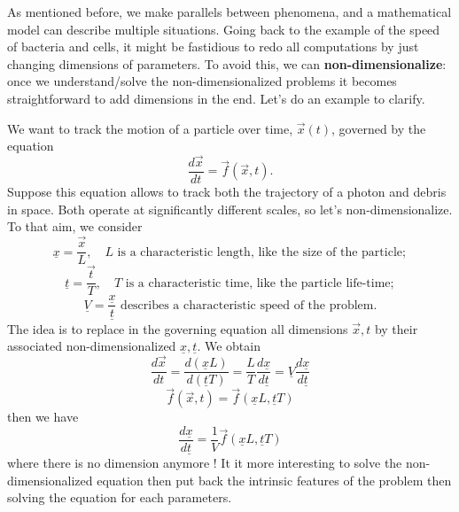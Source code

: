As mentioned before, we make parallels between phenomena, and a mathematical model can describe multiple situations. Going back to the example of the speed of bacteria and cells, it might be fastidious to redo all computations by just changing dimensions of parameters. To avoid this, we can \textbf{non-dimensionalize}: once we understand/solve the non-dimensionalized problems it becomes straightforward to add dimensions in the end. Let's do an example to clarify.

\begin{Example}
We want to track the motion of a particle over time, $\vec{x}(t)$, governed by the equation
\[ \displaystyle \frac{d \vec{x}}{dt} = \vec{f}(\vec{x},t).\]
Suppose this equation allows to track both the trajectory of a photon and debris in space. Both operate at significantly different scales, so let's non-dimensionalize. To that aim, we consider
\[ \underline{x} = \displaystyle \frac{\vec{x}}{L}, \quad L \mbox{ is a characteristic length, like the size of the particle} ;\]
\[ \underline{t} = \displaystyle \frac{\vec{t}}{T}, \quad T \mbox{ is a characteristic time, like the particle life-time} ;\]
\[ \underline{V} = \displaystyle \frac{\underline{x}}{\underline{t}} \mbox{ describes a characteristic speed of the problem}.\]
The idea is to replace in the governing equation all dimensions $\vec{x}, t$ by their associated non-dimensionalized $\underline{x}, \underline{t}$. We obtain
\[ 
\displaystyle \frac{d \vec{x}}{dt} =  \frac{d (\underline{x} L) }{d (\underline{t}T)} = \frac{ L}{T} \frac{d \underline{x}  }{d \underline{t}} = \underline{V} \frac{d \underline{x}  }{d \underline{t}} \]
\[ 
\displaystyle \vec{f}(\vec{x},t)=  \vec{f}(\underline{x} L,\underline{t}T)
\]
then we have
\[ \displaystyle \frac{d \underline{x}  }{d \underline{t}}  = \frac{1}{V}  \vec{f}(\underline{x} L,\underline{t}T) \]
where there is no dimension anymore ! It it more interesting to solve the non-dimensionalized equation then put back the intrinsic features of the problem then solving the equation for each parameters. 
\end{Example}

